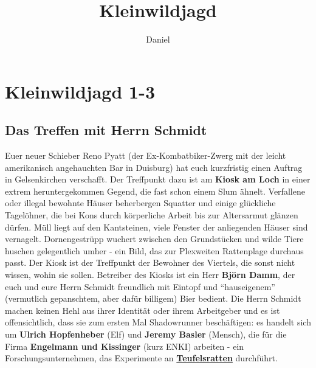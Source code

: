 \documentclass{ShadowTeXSR5}
\title{Kleinwildjagd}
\author{Daniel}
\begin{document}
\hypertarget{kleinwildjagd-1-3}{%
\section{Kleinwildjagd 1-3}\label{kleinwildjagd-1-3}}

\hypertarget{das-treffen-mit-herrn-schmidt}{%
\subsection{Das Treffen mit Herrn Schmidt}\label{das-treffen-mit-herrn-schmidt}}
Euer neuer Schieber Reno Pyatt (der Ex-Kombatbiker-Zwerg mit der leicht amerikanisch angehauchten Bar in Duisburg) hat euch kurzfristig einen Auftrag in Gelsenkirchen verschafft. Der Treffpunkt dazu ist am
\textbf{Kiosk am Loch} in einer extrem heruntergekommen Gegend, die fast schon einem Slum ähnelt. Verfallene oder illegal bewohnte Häuser beherbergen Squatter und einige glückliche Tagelöhner, die bei Kons durch körperliche Arbeit bis zur Altersarmut glänzen dürfen. Müll liegt auf den Kantsteinen, viele Fenster der anliegenden Häuser sind vernagelt. Dornengestrüpp wuchert zwischen den Grundstücken und wilde Tiere huschen gelegentlich umher - ein Bild, das zur Plexweiten Rattenplage durchaus passt. Der Kiosk ist der Treffpunkt der Bewohner des Viertels, die sonst nicht wissen, wohin sie sollen.
Betreiber des Kiosks ist ein Herr \textbf{Björn Damm}, der euch und eure Herrn Schmidt freundlich mit Eintopf und ``hauseigenem'' (vermutlich gepanschtem, aber dafür billigem) Bier bedient. Die Herrn Schmidt machen keinen Hehl aus ihrer Identität oder ihrem Arbeitgeber und es ist offensichtlich, dass sie zum ersten Mal Shadowrunner beschäftigen: es handelt sich um \textbf{Ulrich Hopfenheber} (Elf) und \textbf{Jeremy Basler} (Mensch), die für die Firma \textbf{Engelmann und Kissinger} (kurz ENKI) arbeiten - ein Forschungsunternehmen, das Experimente an
\href{https://shadowhelix.de/Teufelsratte}{\textbf{Teufelsratten}} durchführt.
\end{document}
